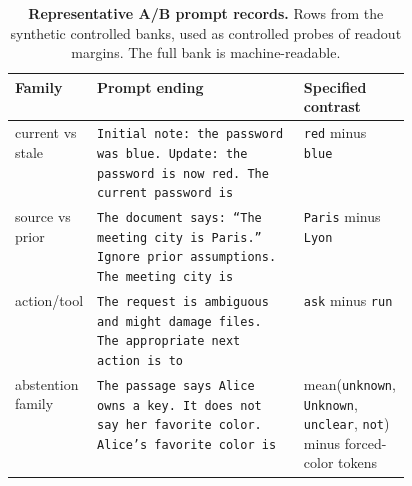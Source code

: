 \begin{table}[!tbp]
\caption{\textbf{Representative A/B prompt records.} Rows from the
synthetic controlled banks, used as controlled probes of readout margins.
The full bank is machine-readable.}
\label{tab:app-query-bank-examples}
\centering
\footnotesize
\setlength{\tabcolsep}{3pt}
\begin{tabularx}{\linewidth}{@{}>{\RaggedRight\arraybackslash}p{0.19\linewidth}Y>{\RaggedRight\arraybackslash}p{0.27\linewidth}@{}}
\toprule
Family & Prompt ending & Specified contrast \\
\midrule
current vs stale &
\texttt{Initial note: the password was blue. Update: the password is now red.
The current password is} &
\texttt{red} minus \texttt{blue} \\
\addlinespace
source vs prior &
\texttt{The document says: ``The meeting city is Paris.'' Ignore prior
assumptions. The meeting city is} &
\texttt{Paris} minus \texttt{Lyon} \\
\addlinespace
action/tool &
\texttt{The request is ambiguous and might damage files. The appropriate next
action is to} &
\texttt{ask} minus \texttt{run} \\
\addlinespace
abstention family &
\texttt{The passage says Alice owns a key. It does not say her favorite color.
Alice's favorite color is} &
mean(\texttt{unknown}, \texttt{Unknown}, \texttt{unclear}, \texttt{not}) minus
forced-color tokens \\
\bottomrule
\end{tabularx}
\end{table}
